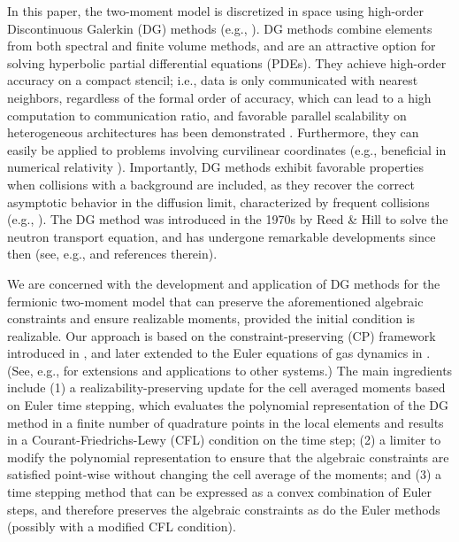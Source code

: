 In this paper, the two-moment model is discretized in space using high-order Discontinuous Galerkin (DG) methods (e.g., \cite{cockburnShu_2001,hesthavenWarburton_2008}).  
DG methods combine elements from both spectral and finite volume methods, and are an attractive option for solving hyperbolic partial differential equations (PDEs).  
They achieve high-order accuracy on a compact stencil; i.e., data is only communicated with nearest neighbors, regardless of the formal order of accuracy, which can lead to a high computation to communication ratio, and favorable parallel scalability on heterogeneous architectures has been demonstrated \cite{klockner_etal_2009}.  
Furthermore, they can easily be applied to problems involving curvilinear coordinates (e.g., beneficial in numerical relativity \cite{teukolsky_2016}).  
Importantly, DG methods exhibit favorable properties when collisions with a background are included, as they recover the correct asymptotic behavior in the diffusion limit, characterized by frequent collisions (e.g., \cite{larsenMorel_1989,adams_2001,guermondKanschat_2010}).  
The DG method was introduced in the 1970s by Reed \& Hill \cite{reedHill_1973} to solve the neutron transport equation, and has undergone remarkable developments since then (see, e.g., \cite{shu_2016} and references therein).  

We are concerned with the development and application of DG methods for the fermionic two-moment model that can preserve the aforementioned algebraic constraints and ensure realizable moments, provided the initial condition is realizable.  
Our approach is based on the constraint-preserving (CP) framework introduced in \cite{zhangShu_2010a}, and later extended to the Euler equations of gas dynamics in \cite{zhangShu_2010b}.  
(See, e.g., \cite{xing_etal_2010,zhangShu_2011,olbrant_etal_2012,cheng_etal_2013,zhang_etal_2013,endeve_etal_2015,wuTang_2015} for extensions and applications to other systems.)  
The main ingredients include (1) a realizability-preserving update for the cell averaged moments based on Euler time stepping, which evaluates the polynomial representation of the DG method in a finite number of quadrature points in the local elements and results in a Courant-Friedrichs-Lewy (CFL) condition on the time step; (2) a limiter to modify the polynomial representation to ensure that the algebraic constraints are satisfied point-wise without changing the cell average of the moments; and (3) a time stepping method that can be expressed as a convex combination of Euler steps, and therefore preserves the algebraic constraints as do the Euler methods (possibly with a modified CFL condition).  

